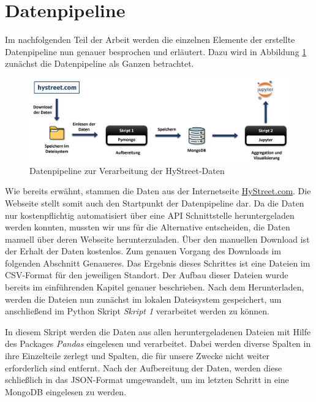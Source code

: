 \section{Datenpipeline}

Im nachfolgenden Teil der Arbeit werden die einzelnen Elemente der erstellte Datenpipeline nun genauer besprochen und erläutert. Dazu wird in Abbildung \ref{fig:datenpipelineFull} zunächst die Datenpipeline als Ganzen betrachtet.

\begin{figure}[h!]
    \vspace{1cm}
    \centering
    \includegraphics[width=0.9\linewidth]{images/datenpipeline.png}
    \caption{Datenpipeline zur Verarbeitung der HyStreet-Daten}
    \label{fig:datenpipelineFull}
    \vspace{0.5cm}
\end{figure}


Wie bereits erwähnt, stammen die Daten aus der Internetseite \href{https://hystreet.com}{HyStreet.com}. Die Webseite stellt somit auch den Startpunkt der Datenpipeline dar. Da die Daten nur kostenpflichtig automatisiert über eine API Schnittstelle heruntergeladen werden konnten, mussten wir uns für die Alternative entscheiden, die Daten manuell über deren Webseite herunterzuladen. Über den manuellen Download ist der Erhalt der Daten kostenlos. 
Zum genauen Vorgang des Downloads im folgenden Abschnitt Genaueres. Das Ergebnis dieses Schrittes ist eine Dateien im CSV-Format für den jeweiligen Standort. Der Aufbau dieser Dateien wurde bereits im einführenden Kapitel genauer beschrieben. Nach dem Herunterladen, werden die Dateien nun zunächst im lokalen Dateisystem gespeichert, um anschließend im Python Skript \emph{Skript 1} verarbeitet werden zu können.

In diesem Skript werden die Daten aus allen heruntergeladenen Dateien mit Hilfe des Packages \emph{Pandas} eingelesen und verarbeitet. Dabei werden diverse Spalten in ihre Einzelteile zerlegt und Spalten, die für unsere Zwecke nicht weiter erforderlich sind entfernt. Nach der Aufbereitung der Daten, werden diese schließlich in das JSON-Format umgewandelt, um im letzten Schritt in eine MongoDB eingelesen zu werden.


